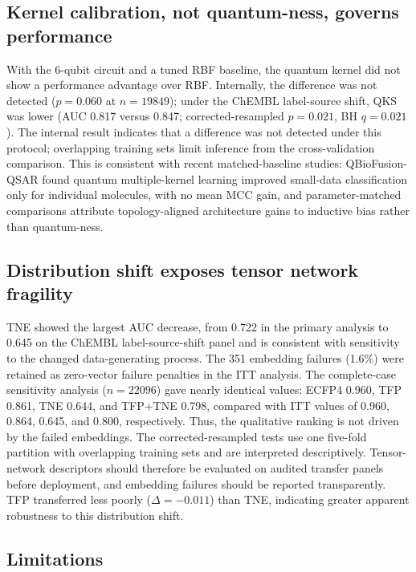 \documentclass[11pt,a4paper]{article}
\begin{document}
\subsection{Kernel calibration, not quantum-ness, governs performance}

With the 6-qubit circuit and a tuned RBF baseline, the quantum kernel did not show a performance advantage over RBF. Internally, the difference was not detected ($p = \num{0.060}$ at $n = \num{19849}$); under the ChEMBL label-source shift, QKS was lower (AUC \num{0.817} versus \num{0.847}; corrected-resampled $p = \num{0.021}$, BH $q = \num{0.021}$). The internal result indicates that a difference was not detected under this protocol; overlapping training sets limit inference from the cross-validation comparison. This is consistent with recent matched-baseline studies: QBioFusion-QSAR \citep{qbiofusion_2026} found quantum multiple-kernel learning improved small-data classification only for individual molecules, with no mean MCC gain, and parameter-matched comparisons \citep{iso_qgnn_2026} attribute topology-aligned architecture gains to inductive bias rather than quantum-ness.

\subsection{Distribution shift exposes tensor network fragility}

TNE showed the largest AUC decrease, from \num{0.722} in the primary analysis to \num{0.645} on the ChEMBL label-source-shift panel and is consistent with sensitivity to the changed data-generating process. The \num{351} embedding failures (\num{1.6}\%) were retained as zero-vector failure penalties in the ITT analysis. The complete-case sensitivity analysis ($n = \num{22096}$) gave nearly identical values: ECFP4 \num{0.960}, TFP \num{0.861}, TNE \num{0.644}, and TFP+TNE \num{0.798}, compared with ITT values of \num{0.960}, \num{0.864}, \num{0.645}, and \num{0.800}, respectively. Thus, the qualitative ranking is not driven by the failed embeddings. The corrected-resampled tests use one five-fold partition with overlapping training sets and are interpreted descriptively. Tensor-network descriptors should therefore be evaluated on audited transfer panels before deployment, and embedding failures should be reported transparently. TFP transferred less poorly ($\Delta = -\num{0.011}$) than TNE, indicating greater apparent robustness to this distribution shift.

\subsection{Limitations}
\end{document}
